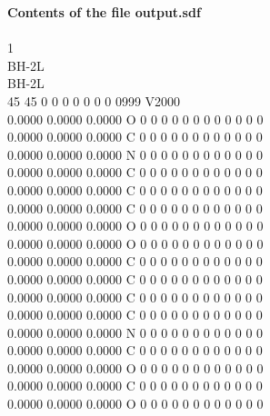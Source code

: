 \documentclass[11pt,titlepage,dvipdfmx,twoside]{article}
\begin{document}
\begin{oframed}
{\bf Contents of the file output.sdf}\\\\
{1                                                                          \\
BH-2L                                                                      \\
BH-2L                                                                      \\
 45 45  0  0  0  0  0  0  0  0999 V2000                                    \\
    0.0000    0.0000    0.0000  O  0  0  0  0  0  0  0  0  0  0  0  0      \\
    0.0000    0.0000    0.0000  C  0  0  0  0  0  0  0  0  0  0  0  0      \\
    0.0000    0.0000    0.0000  N  0  0  0  0  0  0  0  0  0  0  0  0      \\
    0.0000    0.0000    0.0000  C  0  0  0  0  0  0  0  0  0  0  0  0      \\
    0.0000    0.0000    0.0000  C  0  0  0  0  0  0  0  0  0  0  0  0      \\
    0.0000    0.0000    0.0000  C  0  0  0  0  0  0  0  0  0  0  0  0      \\
    0.0000    0.0000    0.0000  O  0  0  0  0  0  0  0  0  0  0  0  0      \\
    0.0000    0.0000    0.0000  O  0  0  0  0  0  0  0  0  0  0  0  0      \\
    0.0000    0.0000    0.0000  C  0  0  0  0  0  0  0  0  0  0  0  0      \\
    0.0000    0.0000    0.0000  C  0  0  0  0  0  0  0  0  0  0  0  0      \\
    0.0000    0.0000    0.0000  C  0  0  0  0  0  0  0  0  0  0  0  0      \\
    0.0000    0.0000    0.0000  C  0  0  0  0  0  0  0  0  0  0  0  0      \\
    0.0000    0.0000    0.0000  N  0  0  0  0  0  0  0  0  0  0  0  0      \\
    0.0000    0.0000    0.0000  C  0  0  0  0  0  0  0  0  0  0  0  0      \\
    0.0000    0.0000    0.0000  O  0  0  0  0  0  0  0  0  0  0  0  0      \\
    0.0000    0.0000    0.0000  C  0  0  0  0  0  0  0  0  0  0  0  0      \\
    0.0000    0.0000    0.0000  O  0  0  0  0  0  0  0  0  0  0  0  0      \\
}
\end{oframed}
\end{document}
